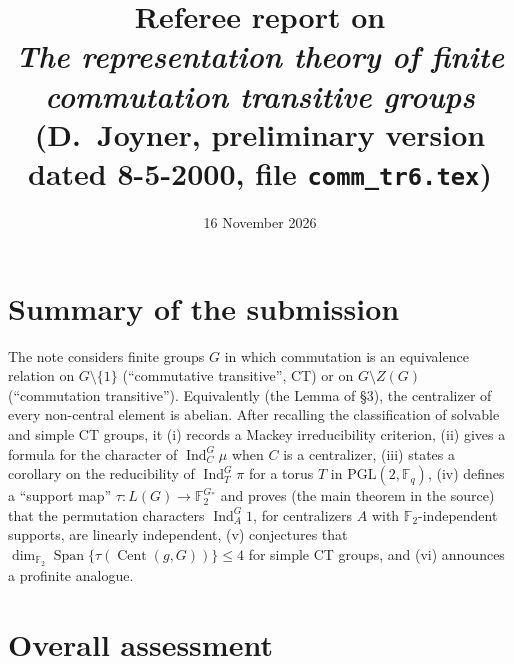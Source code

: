 \documentclass[12pt,letterpaper]{article}
\title{Referee report on\\
\emph{The representation theory of finite commutation transitive groups}\\
(D.~Joyner, preliminary version dated 8-5-2000, file \texttt{comm\_tr6.tex})}
\author{}
\date{16 November 2026}
\newcommand{\F}{\mathbb{F}}
\newcommand{\Cent}{\operatorname{Cent}}
\newcommand{\Ind}{\operatorname{Ind}}
\newcommand{\PGL}{\mathrm{PGL}}
\theoremstyle{definition}
\begin{document}
\maketitle

\section*{Summary of the submission}

The note considers finite groups $G$ in which commutation is an
equivalence relation on $G\setminus\{1\}$ (``commutative transitive'',
CT) or on $G\setminus Z(G)$ (``commutation transitive''). Equivalently
(the Lemma of \S3), the centralizer of every non-central element is
abelian. After recalling the classification of solvable and simple CT
groups, it (i) records a Mackey irreducibility criterion, (ii) gives a
formula for the character of $\Ind_C^G\mu$ when $C$ is a centralizer,
(iii) states a corollary on the reducibility of $\Ind_T^G\pi$ for a
torus $T$ in $\PGL(2,\F_q)$, (iv) defines a ``support map''
$\tau\colon L(G)\to\F_2^{G_*}$ and proves (the main theorem in
the source) that the permutation characters $\Ind_A^G 1$, for
centralizers $A$ with $\F_2$-independent supports, are linearly
independent, (v) conjectures that $\dim_{\F_2}\operatorname{Span}
\{\tau(\Cent(g,G))\}\le 4$ for simple CT groups, and (vi) announces a
profinite analogue.

\section*{Overall assessment}
\end{document}

